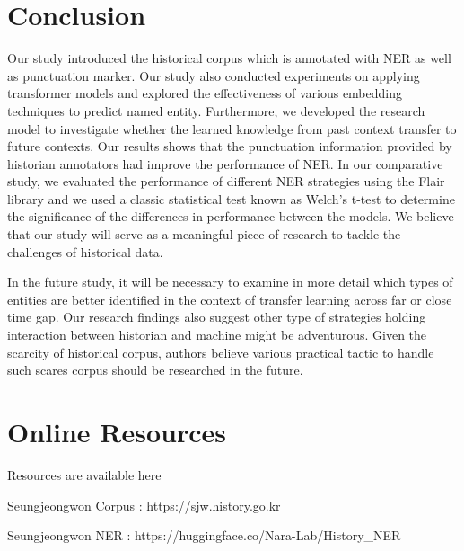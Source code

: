 \documentclass[sigconf]{acmart}
\begin{document}
\section{Conclusion}
Our study introduced the historical corpus which is annotated with NER as well as punctuation marker. Our study also conducted experiments on applying transformer models and explored the effectiveness of various embedding techniques to predict named entity. Furthermore, we developed the research model to investigate whether the learned knowledge from past context transfer to future contexts. Our results shows that the punctuation information provided by historian annotators had improve the performance of NER. In our comparative study, we evaluated the performance of different NER strategies using the Flair library and we used a classic statistical test known as Welch's t-test to determine the significance of the differences in performance between the models. We believe that our study will serve as a meaningful piece of research to tackle the challenges of historical data.  

In the future study, it will be necessary to examine in more detail which types of entities are better identified in the context of transfer learning across far or close time gap. Our research findings also suggest other type of strategies holding interaction between historian and machine might be adventurous. Given the scarcity of historical corpus, authors believe various practical tactic to handle such scares corpus should be researched in the future. 









  
  

  
  








\section{Online Resources}

Resources are available here

Seungjeongwon Corpus : https://sjw.history.go.kr

Seungjeongwon NER : https://huggingface.co/Nara-Lab/History\_NER 
\end{document}
